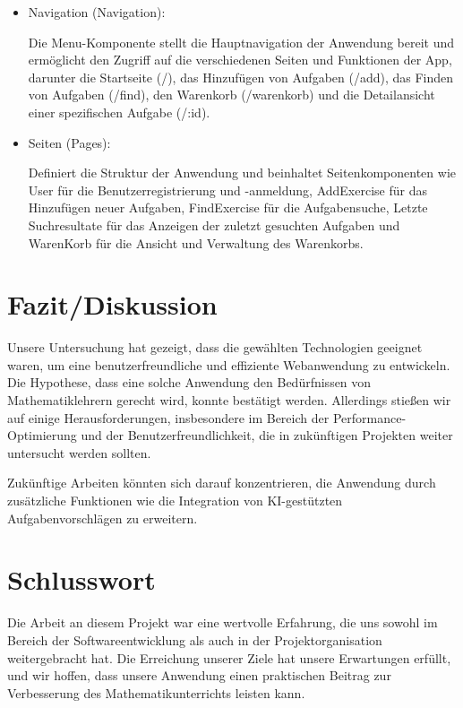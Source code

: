 \documentclass[12pt,a4paper]{scrartcl} %
\begin{document}
\begin{itemize}
\item Navigation (Navigation):

Die Menu-Komponente stellt die Hauptnavigation der Anwendung bereit und ermöglicht den Zugriff auf die verschiedenen Seiten und Funktionen der App, darunter die Startseite (/), das Hinzufügen von Aufgaben (/add), das Finden von Aufgaben (/find), den Warenkorb (/warenkorb) und die Detailansicht einer spezifischen Aufgabe (/:id).

\item Seiten (Pages):

Definiert die Struktur der Anwendung und beinhaltet Seitenkomponenten wie User für die Benutzerregistrierung und -anmeldung, AddExercise für das Hinzufügen neuer Aufgaben, FindExercise für die Aufgabensuche, Letzte Suchresultate für das Anzeigen der zuletzt gesuchten Aufgaben und WarenKorb für die Ansicht und Verwaltung des Warenkorbs.

\end{itemize}


\section{Fazit/Diskussion}
Unsere Untersuchung hat gezeigt, dass die gewählten Technologien geeignet waren, um eine benutzerfreundliche und effiziente Webanwendung zu entwickeln. Die Hypothese, dass eine solche Anwendung den Bedürfnissen von Mathematiklehrern gerecht wird, konnte bestätigt werden. Allerdings stießen wir auf einige Herausforderungen, insbesondere im Bereich der Performance-Optimierung und der Benutzerfreundlichkeit, die in zukünftigen Projekten weiter untersucht werden sollten.

Zukünftige Arbeiten könnten sich darauf konzentrieren, die Anwendung durch zusätzliche Funktionen wie die Integration von KI-gestützten Aufgabenvorschlägen zu erweitern.

\section{Schlusswort}
Die Arbeit an diesem Projekt war eine wertvolle Erfahrung, die uns sowohl im Bereich der Softwareentwicklung als auch in der Projektorganisation weitergebracht hat. Die Erreichung unserer Ziele hat unsere Erwartungen erfüllt, und wir hoffen, dass unsere Anwendung einen praktischen Beitrag zur Verbesserung des Mathematikunterrichts leisten kann.

\newpage
   
  
\appendix
\end{document}
